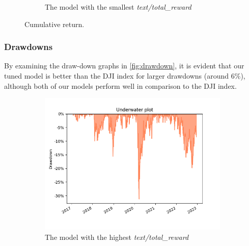 \documentclass[../xlapes02]{subfiles}
\begin{document}
\begin{figure}[h!]
\begin{subfigure}[t]{\experimentimgwidth\textwidth}
            \caption{The model with the smallest \emph{text/total\_reward}}
            \label{fig:returns_min}
        \end{subfigure}
        \caption{Cumulative return.}
        \label{fig:cumulative_return}
    \end{figure}

    \subsubsection{Drawdowns}
    By examining the draw-down graphs in \cref{fig:drawdown}, it is evident that our tuned model is better than the DJI index for larger drawdowns (around $6\%$), although both of our models perform well in comparison to the DJI index.
    \begin{figure}[h!]
        \begin{subfigure}[t]{\experimentimgwidth\textwidth}
            \centering
            \includegraphics[width=\linewidth]{image/figure/drawdown_underwater_max}
            \caption{The model with the highest \emph{text/total\_reward}}
            \label{fig:drawdown_underwater_max}
        \end{subfigure}
        \hfill
        \begin{subfigure}[t]{\experimentimgwidth\textwidth}
            \centering

\end{subfigure}
\end{figure}
\end{document}
